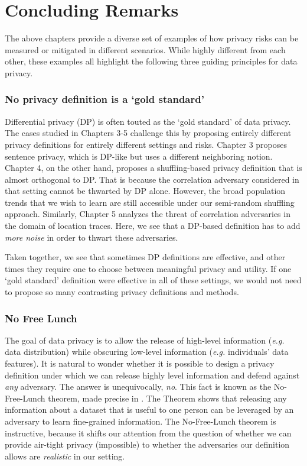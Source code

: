 \chapter*{Concluding Remarks}
The above chapters provide a diverse set of examples of how privacy risks can be measured or mitigated in different scenarios. While highly different from each other, these examples all highlight the following three guiding principles for data privacy.

\subsection*{No privacy definition is a `gold standard'}
Differential privacy (DP) is often touted as the `gold standard' of data privacy. The cases studied in Chapters 3-5 challenge this by proposing entirely different privacy definitions for entirely different settings and risks. Chapter 3 proposes sentence privacy, which is DP-like but uses a different neighboring notion. Chapter 4, on the other hand, proposes a shuffling-based privacy definition that is almost orthogonal to DP. That is because the correlation adversary considered in that setting cannot be thwarted by DP alone. However, the broad population trends that we wish to learn are still accessible under our semi-random shuffling approach. Similarly, Chapter 5 analyzes the threat of correlation adversaries in the domain of location traces. Here, we see that a DP-based definition has to add \emph{more noise} in order to thwart these adversaries.

Taken together, we see that sometimes DP definitions are effective, and other times they require one to choose between meaningful privacy and utility. If one `gold standard' definition were effective in all of these settings, we would not need to propose so many contrasting privacy definitions and methods. 

\subsection*{No Free Lunch}
The goal of data privacy is to allow the release of high-level information (\emph{e.g.} data distribution) while obscuring low-level information (\emph{e.g.} individuals' data features). It is natural to wonder whether it is possible to design a privacy definition under which we can release highly level information and defend against \emph{any} adversary. The answer is unequivocally, \emph{no}. This fact is known as the No-Free-Lunch theorem, made precise in \cite{Kifer}. The Theorem shows that releasing any information about a dataset that is useful to one person can be leveraged by an adversary to learn fine-grained information. The No-Free-Lunch theorem is instructive, because it shifts our attention from the question of whether we can provide air-tight privacy (impossible) to whether the adversaries our definition allows are \emph{realistic} in our setting. 

